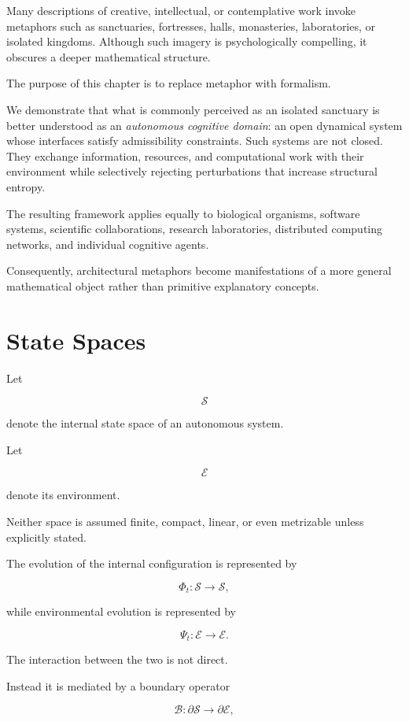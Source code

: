 \documentclass[11pt,oneside]{book}
\numberwithin{equation}{chapter}
\theoremstyle{definition}
\theoremstyle{plain}
\begin{document}
Many descriptions of creative, intellectual, or contemplative work invoke
metaphors such as sanctuaries, fortresses, halls, monasteries, laboratories,
or isolated kingdoms. Although such imagery is psychologically compelling,
it obscures a deeper mathematical structure.

The purpose of this chapter is to replace metaphor with formalism.

We demonstrate that what is commonly perceived as an isolated sanctuary is
better understood as an \emph{autonomous cognitive domain}: an open dynamical
system whose interfaces satisfy admissibility constraints. Such systems are
not closed. They exchange information, resources, and computational work with
their environment while selectively rejecting perturbations that increase
structural entropy.

The resulting framework applies equally to biological organisms, software
systems, scientific collaborations, research laboratories, distributed
computing networks, and individual cognitive agents.

Consequently, architectural metaphors become manifestations of a more general
mathematical object rather than primitive explanatory concepts.

\section{State Spaces}

Let

\[
\mathcal{S}
\]

denote the internal state space of an autonomous system.

Let

\[
\mathcal{E}
\]

denote its environment.

Neither space is assumed finite, compact, linear, or even metrizable unless
explicitly stated.

The evolution of the internal configuration is represented by

\[
\Phi_t:\mathcal{S}\rightarrow\mathcal{S},
\]

while environmental evolution is represented by

\[
\Psi_t:\mathcal{E}\rightarrow\mathcal{E}.
\]

The interaction between the two is not direct.

Instead it is mediated by a boundary operator

\[
\mathcal{B}:
\partial\mathcal{S}
\rightarrow
\partial\mathcal{E},
\]
\end{document}
